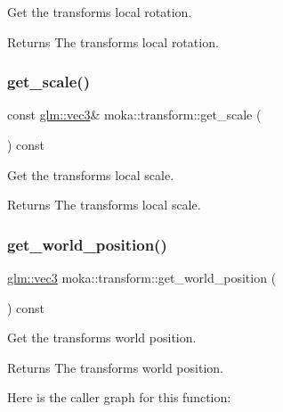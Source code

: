 Get the transform\textquotesingle{}s local rotation. 

\begin{DoxyReturn}{Returns}
The transform\textquotesingle{}s local rotation. 
\end{DoxyReturn}
\mbox{\label{classmoka_1_1transform_a029e29caae092f78166cd208137aae18}} 
\subsubsection{\texorpdfstring{get\_scale()}{get\_scale()}}
{\footnotesize\ttfamily const \mbox{\hyperlink{namespacemoka_aed2224bc0e5b79e57a8975ded94ee1aaa97ade28e93c0de60adc075bdbe07ca36}{glm\+::vec3}}\& moka\+::transform\+::get\+\_\+scale (\begin{DoxyParamCaption}{ }\end{DoxyParamCaption}) const}



Get the transform\textquotesingle{}s local scale. 

\begin{DoxyReturn}{Returns}
The transform\textquotesingle{}s local scale. 
\end{DoxyReturn}
\mbox{\label{classmoka_1_1transform_a1be839aea05acb7c03a393a3b9f9d776}} 
\subsubsection{\texorpdfstring{get\_world\_position()}{get\_world\_position()}}
{\footnotesize\ttfamily \mbox{\hyperlink{namespacemoka_aed2224bc0e5b79e57a8975ded94ee1aaa97ade28e93c0de60adc075bdbe07ca36}{glm\+::vec3}} moka\+::transform\+::get\+\_\+world\+\_\+position (\begin{DoxyParamCaption}{ }\end{DoxyParamCaption}) const}



Get the transform\textquotesingle{}s world position. 

\begin{DoxyReturn}{Returns}
The transform\textquotesingle{}s world position. 
\end{DoxyReturn}
Here is the caller graph for this function\+:
\mbox{\label{classmoka_1_1transform_ac5dbabdc02770433d351204cfbb199be}} 
